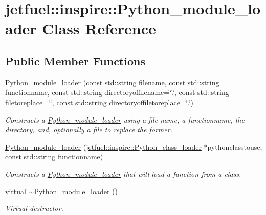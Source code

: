 \hypertarget{classjetfuel_1_1inspire_1_1Python__module__loader}{}\section{jetfuel\+:\+:inspire\+:\+:Python\+\_\+module\+\_\+loader Class Reference}
\label{classjetfuel_1_1inspire_1_1Python__module__loader}
\subsection*{Public Member Functions}
\begin{DoxyCompactItemize}
\item 
\hyperlink{classjetfuel_1_1inspire_1_1Python__module__loader_a30ab85906d5365ca34ca47b456460353}{Python\+\_\+module\+\_\+loader} (const std\+::string filename, const std\+::string functionname, const std\+::string directoryoffilename=\char`\"{}.\char`\"{}, const std\+::string filetoreplace=\char`\"{}\char`\"{}, const std\+::string directoryoffiletoreplace=\char`\"{}.\char`\"{})
\begin{DoxyCompactList}\small\item\em Constructs a \hyperlink{classjetfuel_1_1inspire_1_1Python__module__loader}{Python\+\_\+module\+\_\+loader} using a file-\/name, a functionname, the directory, and, optionally a file to replace the former. \end{DoxyCompactList}\item 
\hyperlink{classjetfuel_1_1inspire_1_1Python__module__loader_addb900473108ecea10d36eceb9917920}{Python\+\_\+module\+\_\+loader} (\hyperlink{classjetfuel_1_1inspire_1_1Python__class__loader}{jetfuel\+::inspire\+::\+Python\+\_\+class\+\_\+loader} $\ast$pythonclasstouse, const std\+::string functionname)
\begin{DoxyCompactList}\small\item\em Constructs a \hyperlink{classjetfuel_1_1inspire_1_1Python__module__loader}{Python\+\_\+module\+\_\+loader} that will load a function from a class. \end{DoxyCompactList}\item 
virtual \hyperlink{classjetfuel_1_1inspire_1_1Python__module__loader_a87c6c13c50ca78e59e19d291355a8bc5}{$\sim$\+Python\+\_\+module\+\_\+loader} ()
\begin{DoxyCompactList}\small\item\em Virtual destructor. \end{DoxyCompactList}\item 

\end{DoxyCompactItemize}
